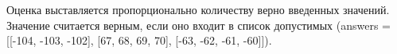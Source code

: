 \markSection

Оценка выставляется пропорционально количеству верно введенных значений. Значение считается верным, если оно входит в список допустимых (answers = [[-104, -103, -102], [67, 68, 69, 70], [-63, -62, -61, -60]]). 


